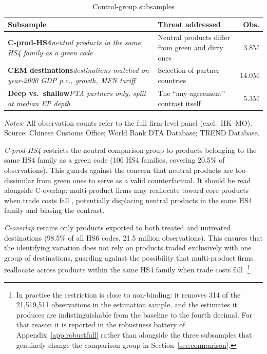 \documentclass[12pt]{article}
\begin{document}
\begin{table}[htbp]
\centering
\caption{Control-group subsamples}
\label{tab:samples}
\small
\begin{threeparttable}
\begin{tabular}{@{}p{4.4cm}p{5.4cm}r@{}}
\toprule
Subsample & Threat addressed & Obs. \\
\midrule
\textbf{C-prod-HS4}\newline \emph{\small neutral products in the same HS4 family as a green code} & Neutral products differ from green and dirty ones & 3.8M \\
\addlinespace
\textbf{CEM destinations}\newline \emph{\small destinations matched on year-2000 GDP p.c., growth, MFN tariff} & Selection of partner countries & 14.0M \\
\addlinespace
\textbf{Deep vs.\ shallow}\newline \emph{\small PTA partners only, split at median EP depth} & The ``any-agreement'' contrast itself & 5.3M \\
\bottomrule
\end{tabular}
\begin{tablenotes}\footnotesize
\item \emph{Notes:} All observation counts refer to the full firm-level panel (excl.\ HK--MO). Source: Chinese Customs Office; World Bank DTA Database; TREND Database.
\end{tablenotes}
\end{threeparttable}
\end{table}

\emph{C-prod-HS4} restricts the neutral comparison group to products belonging to the
same HS4 family as a green code (106 HS4 families, covering 20.5\% of observations).
This guards against the concern that neutral products are too dissimilar from green ones
to serve as a valid counterfactual. It should be read alongside C-overlap: multi-product
firms may reallocate toward core products when trade costs fall \citep{eckel2010},
potentially displacing neutral products in the same HS4 family and biasing the contrast.

\emph{C-overlap} retains only products exported to both treated and untreated destinations (98.5\% of all HS6 codes, 21.5 million observations). This ensures that the identifying variation does not rely on products traded exclusively with one group of destinations, guarding against the possibility that multi-product firms reallocate across products within the same HS4 family when trade costs fall \citep{eckel2010}.\footnote{In practice the restriction is close to non-binding: it removes 314 of the 21{,}519{,}511 observations in the estimation sample, and the estimates it produces are indistinguishable from the baseline to the fourth decimal. For that reason it is reported in the robustness battery of Appendix~\ref{app:robustfull} rather than alongside the three subsamples that genuinely change the comparison group in Section~\ref{sec:comparison}.}
\end{document}

